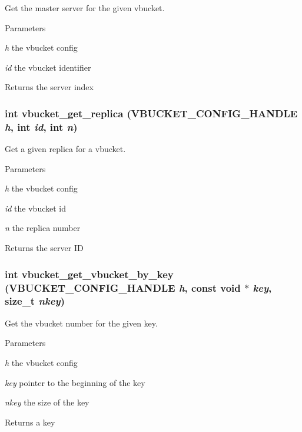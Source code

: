 Get the master server for the given vbucket. 


\begin{DoxyParams}{Parameters}
\item[{\em h}]the vbucket config \item[{\em id}]the vbucket identifier\end{DoxyParams}
\begin{DoxyReturn}{Returns}
the server index 
\end{DoxyReturn}
\hypertarget{group__vb_ga81e3c7d204c5b0506aaa8297eca90a63}{
\subsubsection[{vbucket\_\-get\_\-replica}]{\setlength{\rightskip}{0pt plus 5cm}int vbucket\_\-get\_\-replica (VBUCKET\_\-CONFIG\_\-HANDLE {\em h}, \/  int {\em id}, \/  int {\em n})}}
\label{group__vb_ga81e3c7d204c5b0506aaa8297eca90a63}


Get a given replica for a vbucket. 


\begin{DoxyParams}{Parameters}
\item[{\em h}]the vbucket config \item[{\em id}]the vbucket id \item[{\em n}]the replica number\end{DoxyParams}
\begin{DoxyReturn}{Returns}
the server ID 
\end{DoxyReturn}
\hypertarget{group__vb_ga986d488595a80170c3d768373e8a3acc}{
\subsubsection[{vbucket\_\-get\_\-vbucket\_\-by\_\-key}]{\setlength{\rightskip}{0pt plus 5cm}int vbucket\_\-get\_\-vbucket\_\-by\_\-key (VBUCKET\_\-CONFIG\_\-HANDLE {\em h}, \/  const void $\ast$ {\em key}, \/  size\_\-t {\em nkey})}}
\label{group__vb_ga986d488595a80170c3d768373e8a3acc}


Get the vbucket number for the given key. 


\begin{DoxyParams}{Parameters}
\item[{\em h}]the vbucket config \item[{\em key}]pointer to the beginning of the key \item[{\em nkey}]the size of the key\end{DoxyParams}
\begin{DoxyReturn}{Returns}
a key 
\end{DoxyReturn}
